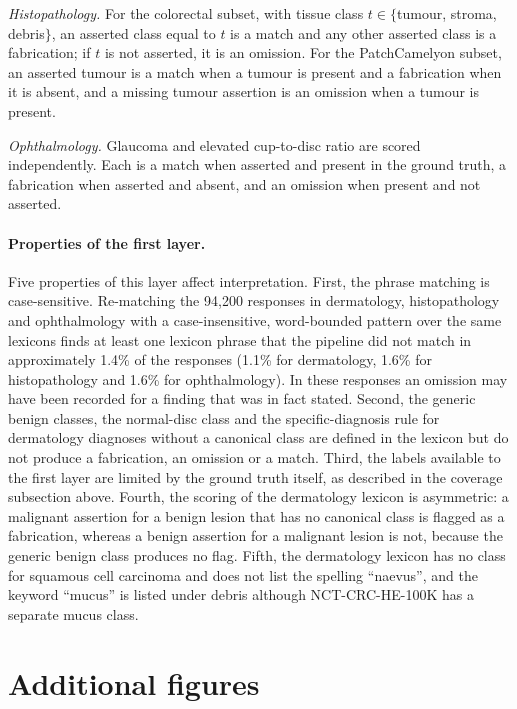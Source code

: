 \documentclass[11pt,a4paper]{article}
\begin{document}
\begin{appendices}
\emph{Histopathology.} For the colorectal subset, with tissue class $t\in\{$tumour, stroma, debris$\}$, an asserted class equal to $t$ is a match and any other asserted class is a fabrication; if $t$ is not asserted, it is an omission. For the PatchCamelyon subset, an asserted tumour is a match when a tumour is present and a fabrication when it is absent, and a missing tumour assertion is an omission when a tumour is present.

\emph{Ophthalmology.} Glaucoma and elevated cup-to-disc ratio are scored independently. Each is a match when asserted and present in the ground truth, a fabrication when asserted and absent, and an omission when present and not asserted.

\paragraph{Properties of the first layer.}
Five properties of this layer affect interpretation. First, the phrase matching is case-sensitive. Re-matching the 94{,}200 responses in dermatology, histopathology and ophthalmology with a case-insensitive, word-bounded pattern over the same lexicons finds at least one lexicon phrase that the pipeline did not match in approximately 1.4\% of the responses (1.1\% for dermatology, 1.6\% for histopathology and 1.6\% for ophthalmology). In these responses an omission may have been recorded for a finding that was in fact stated. Second, the generic benign classes, the normal-disc class and the specific-diagnosis rule for dermatology diagnoses without a canonical class are defined in the lexicon but do not produce a fabrication, an omission or a match. Third, the labels available to the first layer are limited by the ground truth itself, as described in the coverage subsection above. Fourth, the scoring of the dermatology lexicon is asymmetric: a malignant assertion for a benign lesion that has no canonical class is flagged as a fabrication, whereas a benign assertion for a malignant lesion is not, because the generic benign class produces no flag. Fifth, the dermatology lexicon has no class for squamous cell carcinoma and does not list the spelling ``naevus'', and the keyword ``mucus'' is listed under debris although NCT-CRC-HE-100K has a separate mucus class.


\section{Additional figures}\label{app:figures}



\end{appendices}
\end{document}
